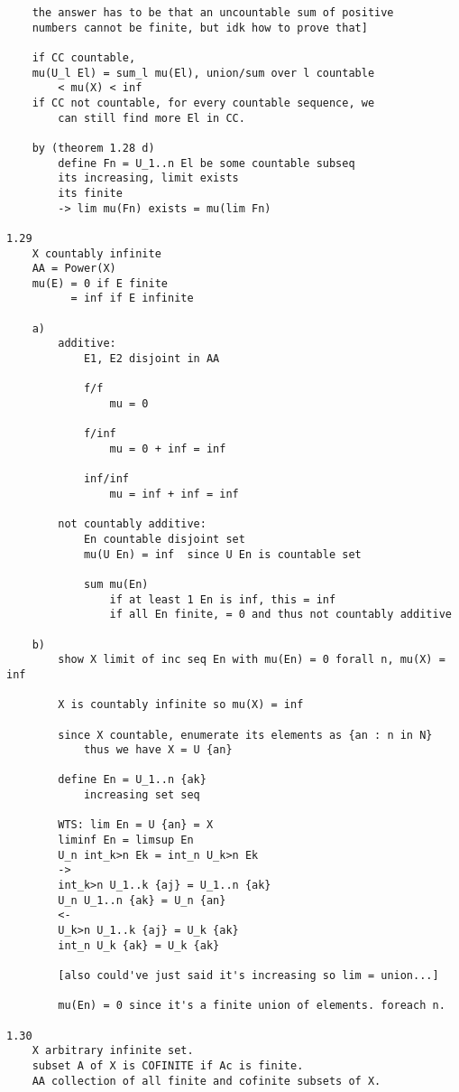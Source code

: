 \documentclass{article}
\begin{document}
\begin{flushleft}
\begin{verbatim}
    the answer has to be that an uncountable sum of positive 
    numbers cannot be finite, but idk how to prove that]

    if CC countable, 
    mu(U_l El) = sum_l mu(El), union/sum over l countable 
        < mu(X) < inf 
    if CC not countable, for every countable sequence, we 
        can still find more El in CC. 

    by (theorem 1.28 d)
        define Fn = U_1..n El be some countable subseq 
        its increasing, limit exists 
        its finite 
        -> lim mu(Fn) exists = mu(lim Fn)

1.29
    X countably infinite 
    AA = Power(X)
    mu(E) = 0 if E finite 
          = inf if E infinite 

    a)
        additive:
            E1, E2 disjoint in AA 

            f/f
                mu = 0

            f/inf 
                mu = 0 + inf = inf 

            inf/inf 
                mu = inf + inf = inf 

        not countably additive: 
            En countable disjoint set 
            mu(U En) = inf  since U En is countable set 

            sum mu(En)
                if at least 1 En is inf, this = inf 
                if all En finite, = 0 and thus not countably additive 
    
    b) 
        show X limit of inc seq En with mu(En) = 0 forall n, mu(X) = inf 

        X is countably infinite so mu(X) = inf 

        since X countable, enumerate its elements as {an : n in N}
            thus we have X = U {an}

        define En = U_1..n {ak}
            increasing set seq 

        WTS: lim En = U {an} = X
        liminf En = limsup En 
        U_n int_k>n Ek = int_n U_k>n Ek
        ->
        int_k>n U_1..k {aj} = U_1..n {ak}
        U_n U_1..n {ak} = U_n {an}
        <- 
        U_k>n U_1..k {aj} = U_k {ak}
        int_n U_k {ak} = U_k {ak}

        [also could've just said it's increasing so lim = union...]

        mu(En) = 0 since it's a finite union of elements. foreach n.

1.30
    X arbitrary infinite set. 
    subset A of X is COFINITE if Ac is finite. 
    AA collection of all finite and cofinite subsets of X.


\end{verbatim}
\end{flushleft}
\end{document}
